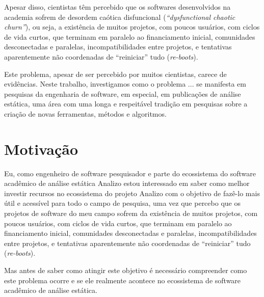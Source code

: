
Apesar disso, cientistas têm percebido que os softwares desenvolvidos na academia 
sofrem de desordem caótica disfuncional ({\it ``dysfunctional chaotic churn''}), 
ou seja, a existência
de muitos projetos, com poucos usuários, com ciclos de vida curtos, que
terminam em paralelo ao financiamento inicial, comunidades desconectadas e
paralelas, incompatibilidades entre projetos, e tentativas aparentemente não
coordenadas de ``reiniciar'' tudo ({\it re-boots}).


Este problema, apesar de ser percebido por muitos cientistas, carece de
evidências. %
Neste trabalho, investigamos como o problema ...  se manifesta em pesquisas da
engenharia de software, em especial, em publicações de análise estática, uma
área com uma longa e respeitável tradição em pesquisas sobre a criação de novas
ferramentas, métodos e algoritmos.

 
\section{Motivação}


Eu, como engenheiro de software pesquisador e parte do ecossistema do software
acadêmico de análise estática Analizo estou interessado em saber como melhor
investir recursos no ecossistema do projeto Analizo com o objetivo de fazê-lo
mais útil e acessível para todo o campo de pesquisa, uma vez que percebo que os
projetos de software do meu campo sofrem da existência de muitos projetos, com
poucos usuários, com ciclos de vida curtos, que terminam em paralelo ao
financiamento inicial, comunidades desconectadas e paralelas,
incompatibilidades entre projetos, e tentativas aparentemente não coordenadas
de ``reiniciar'' tudo ({\it re-boots}).

Mas antes de saber como atingir este objetivo é necessário compreender como
este problema ocorre e se ele realmente acontece no ecossistema de software
acadêmico de análise estática.

